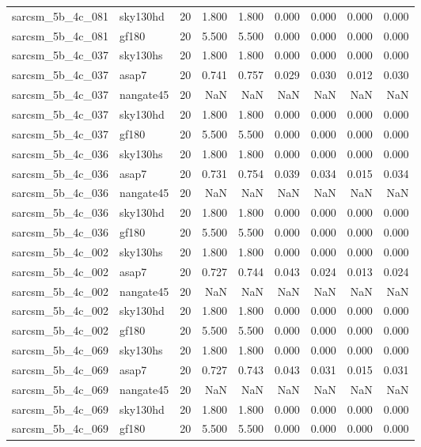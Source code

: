 \begin{tabular}{llrrrrrrr}
sarcsm\_5b\_4c\_081 & sky130hd & 20 & 1.800 & 1.800 & 0.000 & 0.000 & 0.000 & 0.000 \\
sarcsm\_5b\_4c\_081 & gf180 & 20 & 5.500 & 5.500 & 0.000 & 0.000 & 0.000 & 0.000 \\
sarcsm\_5b\_4c\_037 & sky130hs & 20 & 1.800 & 1.800 & 0.000 & 0.000 & 0.000 & 0.000 \\
sarcsm\_5b\_4c\_037 & asap7 & 20 & 0.741 & 0.757 & 0.029 & 0.030 & 0.012 & 0.030 \\
sarcsm\_5b\_4c\_037 & nangate45 & 20 & NaN & NaN & NaN & NaN & NaN & NaN \\
sarcsm\_5b\_4c\_037 & sky130hd & 20 & 1.800 & 1.800 & 0.000 & 0.000 & 0.000 & 0.000 \\
sarcsm\_5b\_4c\_037 & gf180 & 20 & 5.500 & 5.500 & 0.000 & 0.000 & 0.000 & 0.000 \\
sarcsm\_5b\_4c\_036 & sky130hs & 20 & 1.800 & 1.800 & 0.000 & 0.000 & 0.000 & 0.000 \\
sarcsm\_5b\_4c\_036 & asap7 & 20 & 0.731 & 0.754 & 0.039 & 0.034 & 0.015 & 0.034 \\
sarcsm\_5b\_4c\_036 & nangate45 & 20 & NaN & NaN & NaN & NaN & NaN & NaN \\
sarcsm\_5b\_4c\_036 & sky130hd & 20 & 1.800 & 1.800 & 0.000 & 0.000 & 0.000 & 0.000 \\
sarcsm\_5b\_4c\_036 & gf180 & 20 & 5.500 & 5.500 & 0.000 & 0.000 & 0.000 & 0.000 \\
sarcsm\_5b\_4c\_002 & sky130hs & 20 & 1.800 & 1.800 & 0.000 & 0.000 & 0.000 & 0.000 \\
sarcsm\_5b\_4c\_002 & asap7 & 20 & 0.727 & 0.744 & 0.043 & 0.024 & 0.013 & 0.024 \\
sarcsm\_5b\_4c\_002 & nangate45 & 20 & NaN & NaN & NaN & NaN & NaN & NaN \\
sarcsm\_5b\_4c\_002 & sky130hd & 20 & 1.800 & 1.800 & 0.000 & 0.000 & 0.000 & 0.000 \\
sarcsm\_5b\_4c\_002 & gf180 & 20 & 5.500 & 5.500 & 0.000 & 0.000 & 0.000 & 0.000 \\
sarcsm\_5b\_4c\_069 & sky130hs & 20 & 1.800 & 1.800 & 0.000 & 0.000 & 0.000 & 0.000 \\
sarcsm\_5b\_4c\_069 & asap7 & 20 & 0.727 & 0.743 & 0.043 & 0.031 & 0.015 & 0.031 \\
sarcsm\_5b\_4c\_069 & nangate45 & 20 & NaN & NaN & NaN & NaN & NaN & NaN \\
sarcsm\_5b\_4c\_069 & sky130hd & 20 & 1.800 & 1.800 & 0.000 & 0.000 & 0.000 & 0.000 \\
sarcsm\_5b\_4c\_069 & gf180 & 20 & 5.500 & 5.500 & 0.000 & 0.000 & 0.000 & 0.000 \\

\end{tabular}
